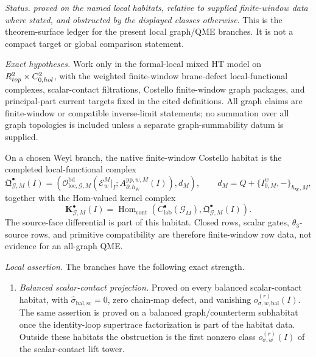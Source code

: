 \begin{stmt}\label{thm:lane-local-graph-qme-branch-catalogue}
  \emph{Status.} \emph{proved on the named local habitats, relative
  to supplied finite-window data where stated, and obstructed by the
  displayed classes otherwise}.  This is the theorem-surface ledger for
  the present local graph/QME branches.  It is not a compact target or
  global comparison statement.

  \emph{Exact hypotheses.} Work only in the formal-local mixed HT model on
  \(R^2_{top}\times C^2_{0,hol}\), with the
  weighted finite-window brane-defect local-functional complexes,
  scalar-contact filtrations, Costello finite-window graph packages, and
  principal-part current targets fixed in the cited definitions.  All
  graph claims are finite-window or compatible inverse-limit statements;
  no summation over all graph topologies is included unless a separate
  graph-summability datum is supplied.

  On a chosen Weyl branch, the native finite-window Costello habitat is
  the completed local-functional complex
  \[
    \mathfrak Q^\bullet_{\mathcal G,M}(I)
    =
    \left(
    \mathcal O^{\mathrm{bd}}_{\mathrm{loc},\mathcal G,M}
    (\mathcal E_w^M|_I;
     A^{\mathrm{pp},w,M}_{\partial,\hbar_{\mathrm{W}}}(I)),
    d_M
    \right),
    \qquad
    d_M=Q+\{I^w_{0,M},-\}_{\hbar_{\mathrm{W}},M},
  \]
  together with the Hom-valued kernel complex
  \[
    \mathbf K^\bullet_{\mathcal G,M}(I)
    =
    \operatorname{Hom}_{\mathrm{cont}}
    (C^\bullet_{\mathrm{lab}}(\mathcal G_M),
     \mathfrak Q^\bullet_{\mathcal G,M}(I)).
  \]
  The source-face differential is part of this habitat.  Closed rows,
  scalar gates, \(\theta_3\)-source rows, and primitive compatibility are
  therefore finite-window row data, not evidence for an all-graph QME.

  \emph{Local assertion.} The branches have the following exact strength.
  \begin{enumerate}[label=(\arabic*)]
    \item \emph{Balanced scalar-contact projection.}  Proved on every
    balanced scalar-contact habitat, with
    \(\widehat\sigma_{\mathrm{bal,sc}}=0\), zero chain-map defect, and
    vanishing \(o_{\sigma,w,\mathrm{bal}}^{(r)}(I)\).  The same assertion
    is proved on a balanced graph/counterterm subhabitat once the
    identity-loop supertrace factorization is part of the habitat data.
    Outside these habitats the obstruction is the first nonzero class
    \(o_{\sigma,w}^{(r)}(I)\) of the scalar-contact lift tower.


\end{enumerate}
\end{stmt}

